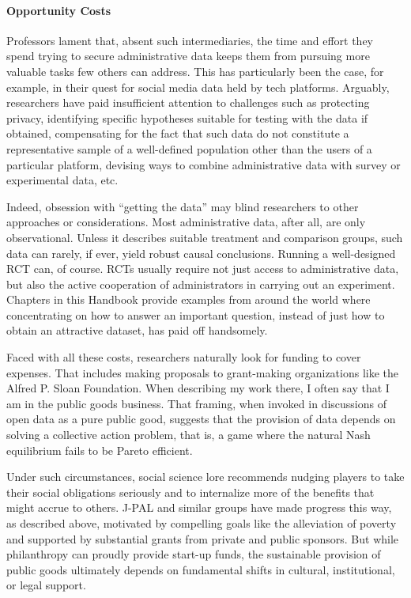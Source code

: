 \paragraph{Opportunity Costs}

Professors lament that, absent such intermediaries, the time and effort
they spend trying to secure administrative data keeps them from pursuing
more valuable tasks few others can address. This has particularly been
the case, for example, in their quest for social media data held by tech
platforms. Arguably, researchers have paid insufficient attention to
challenges such as protecting privacy, identifying specific hypotheses
suitable for testing with the data if obtained, compensating for the
fact that such data do not constitute a representative sample of a
well-defined population other than the users of a particular platform,
devising ways to combine administrative data with survey or experimental
data, etc.

Indeed, obsession with ``getting the data'' may blind researchers to
other approaches or considerations. Most administrative data, after all,
are only observational. Unless it describes suitable treatment and
comparison groups, such data can rarely, if ever, yield robust causal
conclusions. Running a well-designed RCT can, of course. RCTs usually
require not just access to administrative data, but also the active
cooperation of administrators in carrying out an experiment. Chapters in
this Handbook provide examples from around the world where concentrating
on how to answer an important question, instead of just how to obtain an
attractive dataset, has paid off handsomely.

Faced with all these costs, researchers naturally look for funding to cover expenses. That includes making proposals to grant-making organizations like the Alfred P. Sloan Foundation. When describing my work there, I often say that I am in the public goods business. That framing, when invoked in discussions of open data as a pure public good, suggests that the provision of data depends on solving a collective action problem, that is, a game where the natural Nash equilibrium fails to be Pareto efficient.

Under such circumstances, social science lore recommends nudging players to take their social obligations seriously and to internalize more of the benefits that might accrue to others. J-PAL and similar groups have made progress this way, as described above, motivated by compelling goals like the alleviation of poverty and supported by substantial grants from private and public sponsors. But while philanthropy can proudly provide start-up funds, the sustainable provision of public goods ultimately depends on fundamental shifts in cultural, institutional, or legal support.

